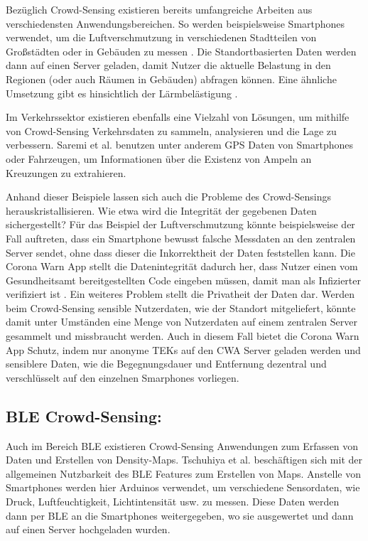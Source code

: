 \documentclass[conference,compsoc]{IEEEtran}
\begin{document}
Bezüglich Crowd-Sensing existieren bereits umfangreiche Arbeiten aus verschiedensten Anwendungsbereichen. 
So werden beispielsweise Smartphones verwendet, um die Luftverschmutzung in verschiedenen Stadtteilen von Großstädten oder in Gebäuden zu messen \cite{AirQuality}. 
Die Standortbasierten Daten werden dann auf einen Server geladen, damit Nutzer die aktuelle Belastung in den Regionen (oder auch Räumen in Gebäuden) abfragen können. 
Eine ähnliche Umsetzung gibt es hinsichtlich der Lärmbelästigung \cite{NoiseSense}. 

Im Verkehrssektor existieren ebenfalls eine Vielzahl von Lösungen, um mithilfe von Crowd-Sensing Verkehrsdaten zu sammeln, analysieren und die Lage zu verbessern. 
Saremi et al. \cite{TrafficRegulators} benutzen unter anderem GPS Daten von Smartphones oder Fahrzeugen, um Informationen über die Existenz von Ampeln an Kreuzungen zu extrahieren. 

Anhand dieser Beispiele lassen sich auch die Probleme des Crowd-Sensings herauskristallisieren. 
Wie etwa wird die Integrität der gegebenen Daten sichergestellt?
Für das Beispiel der Luftverschmutzung könnte beispielsweise der Fall auftreten, dass ein Smartphone bewusst falsche Messdaten an den zentralen Server sendet, ohne dass dieser die Inkorrektheit der Daten feststellen kann.
Die Corona Warn App stellt die Datenintegrität dadurch her, dass Nutzer einen vom Gesundheitsamt bereitgestellten Code eingeben müssen, damit man als Infizierter verifiziert ist \cite{CWA}.
Ein weiteres Problem stellt die Privatheit der Daten dar. 
Werden beim Crowd-Sensing sensible Nutzerdaten, wie der Standort mitgeliefert, könnte damit unter Umständen eine Menge von Nutzerdaten auf einem zentralen Server gesammelt und missbraucht werden.
Auch in diesem Fall bietet die Corona Warn App Schutz, indem nur anonyme TEKs auf den CWA Server geladen werden und sensiblere Daten, wie die Begegnungsdauer und Entfernung dezentral und verschlüsselt auf den einzelnen Smarphones vorliegen.

\subsection{BLE Crowd-Sensing:}
Auch im Bereich BLE existieren Crowd-Sensing Anwendungen zum Erfassen von Daten und Erstellen von Density-Maps. 
Tschuhiya et al. \cite{BLESensorDevices} beschäftigen sich mit der allgemeinen Nutzbarkeit des BLE Features zum Erstellen von Maps. 
Anstelle von Smartphones werden hier Arduinos verwendet, um verschiedene Sensordaten, wie Druck, Luftfeuchtigkeit, Lichtintensität usw. zu messen. 
Diese Daten werden dann per BLE an die Smartphones weitergegeben, wo sie ausgewertet und dann auf einen Server hochgeladen wurden. 
\end{document}
